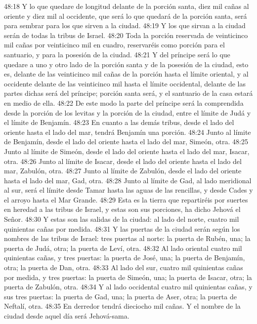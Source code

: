 48:18 Y lo que quedare de longitud delante de la porción santa, diez mil cañas   al oriente y diez mil al occidente, que será lo que quedará de la porción santa, será para sembrar para los que sirven a la ciudad.   
48:19 Y los que sirvan a la ciudad serán de todas la tribus de Israel.   
48:20 Toda la porción reservada de veinticinco mil cañas   por veinticinco mil en cuadro, reservaréis como porción para el santuario, y para la posesión de la ciudad.   
48:21 Y del príncipe será lo que quedare a uno y otro lado de la porción santa y de la posesión de la ciudad, esto es, delante de las veinticinco mil cañas   de la porción hasta el límite oriental, y al occidente delante de las veinticinco mil hasta el límite occidental, delante de las partes dichas será del príncipe; porción santa será, y el santuario de la casa estará en medio de ella.   
48:22 De este modo la parte del príncipe será la comprendida desde la porción de los levitas y la porción de la ciudad, entre el límite de Judá y el límite de Benjamín.   
48:23 En cuanto a las demás tribus, desde el lado del oriente hasta el lado del mar, tendrá Benjamín una porción.   
48:24 Junto al límite de Benjamín, desde el lado del oriente hasta el lado del mar, Simeón, otra.   
48:25 Junto al límite de Simeón, desde el lado del oriente hasta el lado del mar, Isacar, otra.   
48:26 Junto al límite de Isacar, desde el lado del oriente hasta el lado del mar, Zabulón, otra.   
48:27 Junto al límite de Zabulón, desde el lado del oriente hasta el lado del mar, Gad, otra.   
48:28 Junto al límite de Gad, al lado meridional al sur, será el límite desde Tamar hasta las aguas de las rencillas, y desde Cades y el arroyo hasta el Mar Grande.   
48:29 Esta es la tierra que repartiréis por suertes en heredad a las tribus de Israel, y estas son sus porciones, ha dicho Jehová el Señor.   
48:30 Y estas son las salidas de la ciudad: al lado del norte, cuatro mil quinientas cañas   por medida.   
48:31 Y las puertas de la ciudad serán según los nombres de las tribus de Israel: tres puertas al norte: la puerta de Rubén, una; la puerta de Judá, otra; la puerta de Leví, otra.   
48:32 Al lado oriental cuatro mil quinientas cañas, y tres puertas: la puerta de José, una; la puerta de Benjamín, otra; la puerta de Dan, otra.   
48:33 Al lado del sur, cuatro mil quinientas cañas   por medida, y tres puertas: la puerta de Simeón, una; la puerta de Isacar, otra; la puerta de Zabulón, otra.   
48:34 Y al lado occidental cuatro mil quinientas cañas, y sus tres puertas: la puerta de Gad, una; la puerta de Aser, otra; la puerta de Neftalí, otra.   
48:35 En derredor tendrá dieciocho mil cañas. Y el nombre de la ciudad desde aquel día será Jehová-sama.
